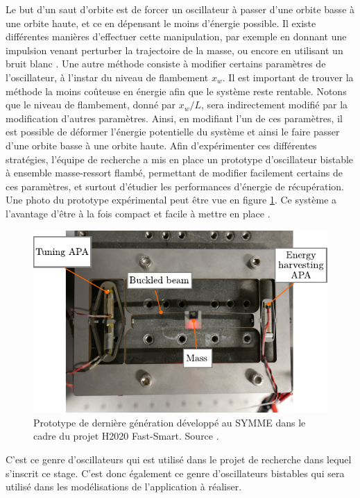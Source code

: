 \documentclass[a4paper, french, 12pt, titlepage]{article}
\begin{document}
Le but d'un saut d'orbite est de forcer un oscillateur à passer d'une orbite basse à une orbite haute, et ce en dépensant le moins d'énergie possible.
Il existe différentes manières d'effectuer cette manipulation, par exemple en donnant une impulsion venant perturber la trajectoire de la masse, ou encore en utilisant un bruit blanc \cite{huguet2018phd}.
Une autre méthode consiste à modifier certains paramètres de l'oscillateur, à l'instar du niveau de flambement $x_w$.
Il est important de trouver la méthode la moins coûteuse en énergie afin que le système reste rentable.
Notons que le niveau de flambement, donné par $x_w/ L$, sera indirectement modifié par la modification d'autres paramètres.
Ainsi, en modifiant l'un de ces paramètres, il est possible de déformer l'énergie potentielle du système et ainsi le faire passer d'une orbite basse à une orbite haute.
Afin d'expérimenter ces différentes stratégies, l'équipe de recherche a mis en place un prototype d'oscillateur bistable à ensemble masse-ressort flambé, permettant de modifier facilement certains de ces paramètres, et surtout d'étudier les performances d'énergie de récupération.
Une photo du prototype expérimental peut être vue en figure \ref{fig:prototype}.
Ce système a l'avantage d'être à la fois compact et facile à mettre en place \cite{Liu2014}.


\begin{figure}
  \begin{center}
    \includegraphics[width=.8\linewidth]{prototype_picture}
  \end{center}

  \caption{Prototype de dernière génération développé au SYMME dans le cadre du projet H2020 Fast-Smart.
  Source \cite{csaintmartin2023preprint}.}
  \label{fig:prototype}
\end{figure}

C'est ce genre d'oscillateurs qui est utilisé dans le projet de recherche dans lequel s'inscrit ce stage.
C'est donc également ce genre d'oscillateurs bistables qui sera utilisé dans les modélisations de l'application à réaliser.\\
\end{document}
